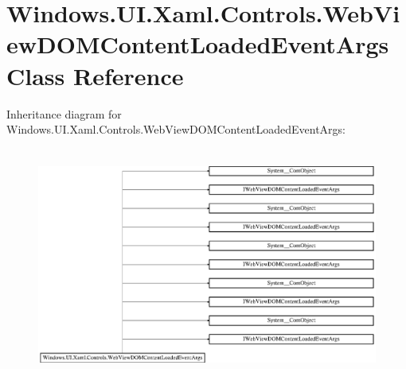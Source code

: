\hypertarget{class_windows_1_1_u_i_1_1_xaml_1_1_controls_1_1_web_view_d_o_m_content_loaded_event_args}{}\section{Windows.\+U\+I.\+Xaml.\+Controls.\+Web\+View\+D\+O\+M\+Content\+Loaded\+Event\+Args Class Reference}
\label{class_windows_1_1_u_i_1_1_xaml_1_1_controls_1_1_web_view_d_o_m_content_loaded_event_args}
Inheritance diagram for Windows.\+U\+I.\+Xaml.\+Controls.\+Web\+View\+D\+O\+M\+Content\+Loaded\+Event\+Args\+:\begin{figure}[H]
\begin{center}
\leavevmode
\includegraphics[height=7.719297cm]{class_windows_1_1_u_i_1_1_xaml_1_1_controls_1_1_web_view_d_o_m_content_loaded_event_args}
\end{center}
\end{figure}

